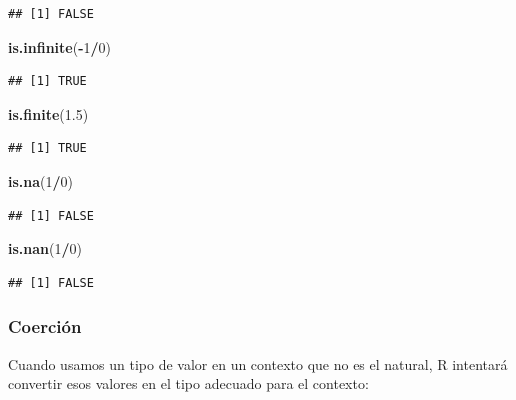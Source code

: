 \documentclass[]{book}
\newenvironment{Shaded}{\begin{snugshade}}{\end{snugshade}}
\newcommand{\KeywordTok}[1]{\textcolor[rgb]{0.13,0.29,0.53}{\textbf{#1}}}
\newcommand{\DecValTok}[1]{\textcolor[rgb]{0.00,0.00,0.81}{#1}}
\newcommand{\FloatTok}[1]{\textcolor[rgb]{0.00,0.00,0.81}{#1}}
\newcommand{\OperatorTok}[1]{\textcolor[rgb]{0.81,0.36,0.00}{\textbf{#1}}}
\newcommand{\NormalTok}[1]{#1}
\theoremstyle{definition}
\theoremstyle{definition}
\theoremstyle{definition}
\theoremstyle{remark}
\begin{document}
\begin{verbatim}
## [1] FALSE
\end{verbatim}

\begin{Shaded}
\begin{Highlighting}[]
\KeywordTok{is.infinite}\NormalTok{(}\OperatorTok{-}\DecValTok{1}\OperatorTok{/}\DecValTok{0}\NormalTok{)}
\end{Highlighting}
\end{Shaded}

\begin{verbatim}
## [1] TRUE
\end{verbatim}

\begin{Shaded}
\begin{Highlighting}[]
\KeywordTok{is.finite}\NormalTok{(}\FloatTok{1.5}\NormalTok{)}
\end{Highlighting}
\end{Shaded}

\begin{verbatim}
## [1] TRUE
\end{verbatim}

\begin{Shaded}
\begin{Highlighting}[]
\KeywordTok{is.na}\NormalTok{(}\DecValTok{1}\OperatorTok{/}\DecValTok{0}\NormalTok{)}
\end{Highlighting}
\end{Shaded}

\begin{verbatim}
## [1] FALSE
\end{verbatim}

\begin{Shaded}
\begin{Highlighting}[]
\KeywordTok{is.nan}\NormalTok{(}\DecValTok{1}\OperatorTok{/}\DecValTok{0}\NormalTok{)}
\end{Highlighting}
\end{Shaded}

\begin{verbatim}
## [1] FALSE
\end{verbatim}

\subsubsection{Coerción}\label{coercion}

Cuando usamos un tipo de valor en un contexto que no es el natural, R
intentará convertir esos valores en el tipo adecuado para el contexto:
\end{document}
